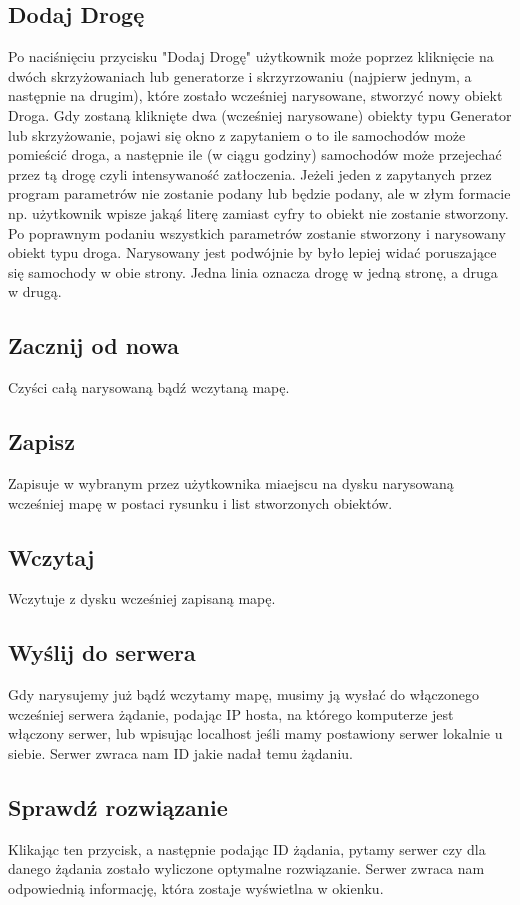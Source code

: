 \documentclass{article}
\begin{document}
\subsection{Dodaj Drogę}
    Po naciśnięciu przycisku "Dodaj Drogę" użytkownik może poprzez kliknięcie na dwóch skrzyżowaniach lub generatorze i skrzyrzowaniu (najpierw jednym, a następnie na drugim), które zostało wcześniej narysowane, stworzyć nowy obiekt Droga. Gdy zostaną kliknięte dwa (wcześniej narysowane) obiekty typu Generator lub skrzyżowanie, pojawi się okno z zapytaniem o to ile samochodów może pomieścić droga, a następnie ile (w ciągu godziny) samochodów może przejechać przez tą drogę czyli intensywaność zatłoczenia. Jeżeli jeden z zapytanych przez program parametrów nie zostanie podany lub będzie podany, ale w złym formacie np. użytkownik wpisze jakąś literę zamiast cyfry to obiekt nie zostanie stworzony. Po poprawnym podaniu wszystkich parametrów zostanie stworzony i narysowany obiekt typu droga. Narysowany jest podwójnie by było lepiej widać poruszające się samochody w obie strony. Jedna linia oznacza drogę w jedną stronę, a druga w drugą.

\subsection{Zacznij od nowa}
    Czyści całą narysowaną bądź wczytaną mapę.

\subsection{Zapisz}
    Zapisuje w wybranym przez użytkownika miaejscu na dysku narysowaną wcześniej mapę w postaci rysunku i list stworzonych obiektów.

\subsection{Wczytaj}
    Wczytuje z dysku wcześniej zapisaną mapę.

\subsection{Wyślij do serwera}
    Gdy narysujemy już bądź wczytamy mapę, musimy ją wysłać do włączonego wcześniej serwera żądanie, podając IP hosta, na którego komputerze jest włączony serwer, lub wpisując localhost jeśli mamy postawiony serwer lokalnie u siebie. Serwer zwraca nam ID jakie nadał temu żądaniu.

\subsection{Sprawdź rozwiązanie}
    Klikając ten przycisk, a następnie podając ID żądania, pytamy serwer czy dla danego żądania zostało wyliczone optymalne rozwiązanie. Serwer zwraca nam odpowiednią informację, która zostaje wyświetlna w okienku.
\end{document}
